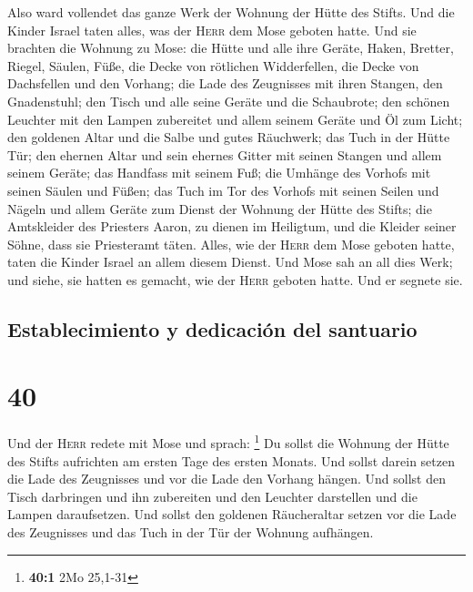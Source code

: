  Also ward vollendet das ganze Werk der Wohnung der Hütte
des Stifts. Und die Kinder Israel taten alles, was der \textsc{Herr} dem
Mose geboten hatte.  Und sie brachten die Wohnung zu
Mose: die Hütte und alle ihre Geräte, Haken, Bretter, Riegel, Säulen,
Füße,  die Decke von rötlichen Widderfellen, die Decke
von Dachsfellen und den Vorhang;  die Lade des Zeugnisses
mit ihren Stangen, den Gnadenstuhl;  den Tisch und alle
seine Geräte und die Schaubrote;  den schönen Leuchter
mit den Lampen zubereitet und allem seinem Geräte und Öl zum Licht;
 den goldenen Altar und die Salbe und gutes Räuchwerk;
das Tuch in der Hütte Tür;  den ehernen Altar und sein
ehernes Gitter mit seinen Stangen und allem seinem Geräte; das Handfass
mit seinem Fuß;  die Umhänge des Vorhofs mit seinen
Säulen und Füßen; das Tuch im Tor des Vorhofs mit seinen Seilen und
Nägeln und allem Geräte zum Dienst der Wohnung der Hütte des Stifts;
 die Amtskleider des Priesters Aaron, zu dienen im
Heiligtum, und die Kleider seiner Söhne, dass sie Priesteramt täten.
 Alles, wie der \textsc{Herr} dem Mose geboten hatte,
taten die Kinder Israel an allem diesem Dienst.  Und Mose
sah an all dies Werk; und siehe, sie hatten es gemacht, wie der
\textsc{Herr} geboten hatte. Und er segnete sie.

\hypertarget{establecimiento-y-dedicaciuxf3n-del-santuario}{%
\subsection{Establecimiento y dedicación del
santuario}\label{establecimiento-y-dedicaciuxf3n-del-santuario}}

\hypertarget{section-39}{%
\section{40}\label{section-39}}

 Und der \textsc{Herr} redete mit Mose und sprach:
\footnote{\textbf{40:1} 2Mo 25,1-31}  Du sollst die
Wohnung der Hütte des Stifts aufrichten am ersten Tage des ersten
Monats.  Und sollst darein setzen die Lade des Zeugnisses
und vor die Lade den Vorhang hängen.  Und sollst den Tisch
darbringen und ihn zubereiten und den Leuchter darstellen und die Lampen
daraufsetzen.  Und sollst den goldenen Räucheraltar setzen
vor die Lade des Zeugnisses und das Tuch in der Tür der Wohnung
aufhängen.

